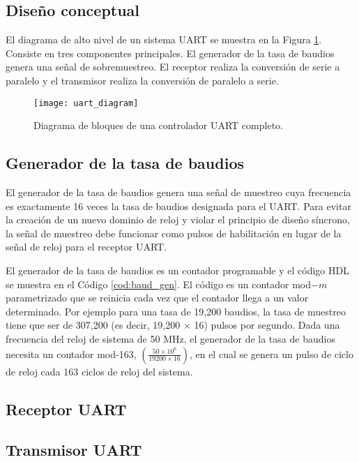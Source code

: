     \subsection{Diseño conceptual}

      El diagrama de alto nivel de un sistema UART se muestra en la Figura \ref{fig:uart_diagram}. Consiste en tres componentes principales. El generador de la tasa de baudios genera una señal de sobremuestreo. El receptor realiza la conversión de serie a paralelo y el transmisor realiza la conversión de paralelo a serie.

    \begin{figure}[h!]
      \centering
      \texttt{[image: uart\_diagram]}
      \caption{Diagrama de bloques de una controlador UART completo.}
      \label{fig:uart_diagram}
    \end{figure}

    \subsection{Generador de la tasa de baudios}

    El generador de la tasa de baudios genera una señal de muestreo cuya frecuencia es exactamente 16 veces la tasa de baudios designada para el UART. Para evitar la creación de un nuevo dominio de reloj y violar el principio de diseño síncrono, la señal de muestreo debe funcionar como pulsos de habilitación en lugar de la señal de reloj para el receptor UART.

    El generador de la tasa de baudios es un contador programable y el código HDL se muestra en el Código \ref{cod:baud_gen}. El código es un contador mod$-m$ parametrizado que se reinicia cada vez que el contador llega a un valor determinado. Por ejemplo para una tasa de 19,200 baudios, la tasa de muestreo tiene que ser de 307,200 (es decir, 19,200 $\times$ 16) pulsos por segundo. Dada una frecuencia del reloj de sistema de 50 MHz, el generador de la tasa de baudios necesita un contador mod-163, $\left( \frac{50 \times 10^{6}}{19200 \times 16} \right)$, en el cual se genera un pulso de ciclo de reloj cada 163 ciclos de reloj del sistema.

    \subsection{Receptor UART}

    \subsection{Transmisor UART}

